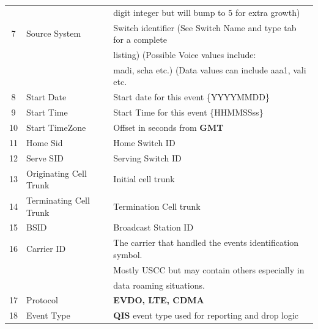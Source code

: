 \documentclass[12pt,twoside]{article}
\begin{document}
\begin{longtable}{cll}
                 &                           &  digit integer but will bump to 5 for extra growth)                     \\
              7  &  Source System            &  Switch identifier (See Switch Name and type tab for a complete         \\
                 &                           &  listing) (Possible Voice values include:                               \\
                 &                           &  madi, scha etc.) (Data values can include aaa1, vali etc.              \\
              8  &  Start Date               &  Start date for this event \{YYYYMMDD\}                                 \\
              9  &  Start Time               &  Start Time for this event \{HHMMSSss\}                                 \\
             10  &  Start TimeZone           &  Offset in seconds from \textbf{GMT}                                    \\
             11  &  Home Sid                 &  Home Switch ID                                                         \\
             12  &  Serve SID                &  Serving Switch ID                                                      \\
             13  &  Originating Cell Trunk   &  Initial cell trunk                                                     \\
             14  &  Terminating Cell Trunk   &  Termination Cell trunk                                                 \\
             15  &  BSID                     &  Broadcast Station ID                                                   \\
             16  &  Carrier ID               &  The carrier that handled the events identification symbol.             \\
                 &                           &  Mostly USCC but may contain others especially in                       \\
                 &                           &  data roaming situations.                                               \\
             17  &  Protocol                 &  \textbf{EVDO, LTE, CDMA}                                               \\
             18  &  Event Type               &  \textbf{QIS} event type used for reporting and drop logic              \\

\end{longtable}
\end{document}

